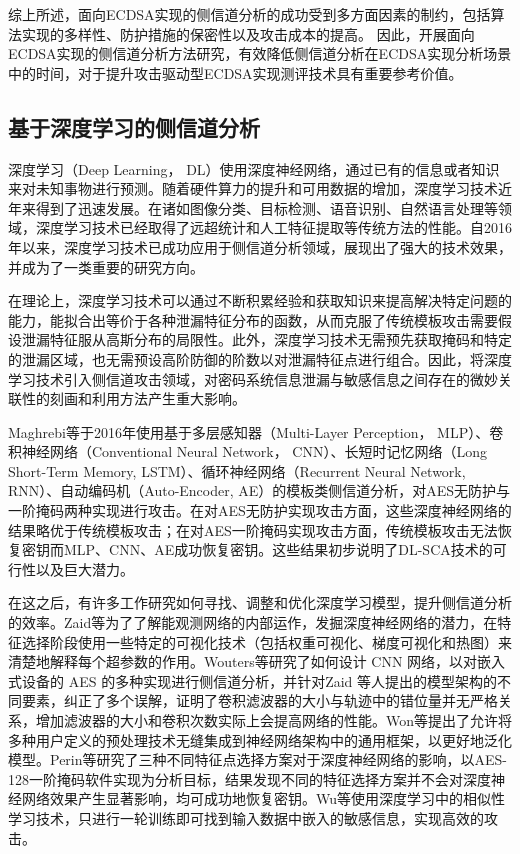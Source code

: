 {	综上所述，面向ECDSA实现的侧信道分析的成功受到多方面因素的制约，包括算法实现的多样性、防护措施的保密性以及攻击成本的提高。
	因此，开展面向ECDSA实现的侧信道分析方法研究，有效降低侧信道分析在ECDSA实现分析场景中的时间，对于提升攻击驱动型ECDSA实现测评技术具有重要参考价值。
	\subsection{基于深度学习的侧信道分析}
	
	深度学习（Deep Learning， DL）使用深度神经网络，通过已有的信息或者知识来对未知事物进行预测。随着硬件算力的提升和可用数据的增加，深度学习技术近年来得到了迅速发展。在诸如图像分类\citep{Szegedy17}、目标检测\citep{Girshick15}、语音识别\citep{Hinton12}、自然语言处理\citep{Radford18}等领域，深度学习技术已经取得了远超统计和人工特征提取等传统方法的性能。自2016年以来，深度学习技术已成功应用于侧信道分析领域，展现出了强大的技术效果，并成为了一类重要的研究方向。%
	
	在理论上，深度学习技术可以通过不断积累经验和获取知识来提高解决特定问题的能力，能拟合出等价于各种泄漏特征分布的函数，从而克服了传统模板攻击需要假设泄漏特征服从高斯分布的局限性。此外，深度学习技术无需预先获取掩码和特定的泄漏区域，也无需预设高阶防御的阶数以对泄漏特征点进行组合。因此，将深度学习技术引入侧信道攻击领域，对密码系统信息泄漏与敏感信息之间存在的微妙关联性的刻画和利用方法产生重大影响。
	
	Maghrebi等\citep{Maghrebi16}于2016年使用基于多层感知器（Multi-Layer Perception， MLP）、卷积神经网络（Conventional Neural Network， CNN）、长短时记忆网络（Long Short-Term Memory, LSTM）、循环神经网络（Recurrent Neural Network, RNN）、自动编码机（Auto-Encoder, AE）的模板类侧信道分析，对AES无防护与一阶掩码两种实现进行攻击。在对AES无防护实现攻击方面，这些深度神经网络的结果略优于传统模板攻击；在对AES一阶掩码实现攻击方面，传统模板攻击无法恢复密钥而MLP、CNN、AE成功恢复密钥。这些结果初步说明了DL-SCA技术的可行性以及巨大潜力。
	
	在这之后，有许多工作研究如何寻找、调整和优化深度学习模型，提升侧信道分析的效率。Zaid等\citep{Zaid20}为了了解能观测网络的内部运作，发掘深度神经网络的潜力，在特征选择阶段使用一些特定的可视化技术（包括权重可视化、梯度可视化和热图）来清楚地解释每个超参数的作用。Wouters等\citep{Wouters20}研究了如何设计 CNN 网络，以对嵌入式设备的 AES 的多种实现进行侧信道分析，并针对Zaid 等人提出的模型架构的不同要素，纠正了多个误解，证明了卷积滤波器的大小与轨迹中的错位量并无严格关系，增加滤波器的大小和卷积次数实际上会提高网络的性能。Won等\citep{Won21}提出了允许将多种用户定义的预处理技术无缝集成到神经网络架构中的通用框架，以更好地泛化模型。Perin等\citep{Perin22}研究了三种不同特征点选择方案对于深度神经网络的影响，以AES-128一阶掩码软件实现为分析目标，结果发现不同的特征选择方案并不会对深度神经网络效果产生显著影响，均可成功地恢复密钥。Wu等\citep{Wu22}使用深度学习中的相似性学习技术，只进行一轮训练即可找到输入数据中嵌入的敏感信息，实现高效的攻击。
	
}
